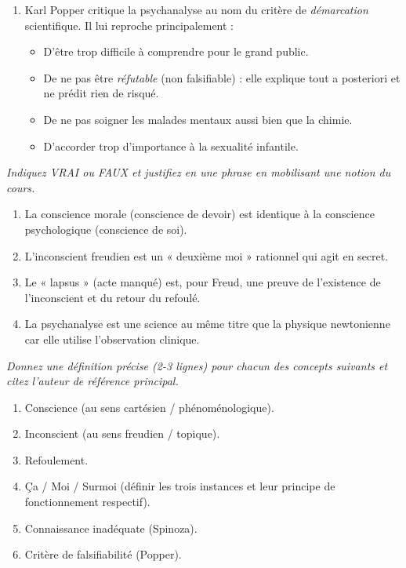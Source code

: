 \documentclass[11pt]{article}
\newcommand{\cle}[1]{{\popxbold\color{popdark}#1}}
\begin{document}
\begin{exercice}
\begin{enumerate}
\begin{itemize}
\item[A.] Le Moi (\emph{Ich}).
\item[B.] Le Surmoi (\emph{Über-Ich}).
\item[C.] Le Ça (\emph{Es}).
\item[D.] Le Préconscient.
\end{itemize}
\item Karl Popper critique la psychanalyse au nom du critère de \emph{démarcation} scientifique. Il lui reproche principalement :
\begin{itemize}
\item[A.] D'être trop difficile à comprendre pour le grand public.
\item[B.] De ne pas être \emph{réfutable} (non falsifiable) : elle explique tout a posteriori et ne prédit rien de risqué.
\item[C.] De ne pas soigner les malades mentaux aussi bien que la chimie.
\item[D.] D'accorder trop d'importance à la sexualité infantile.
\end{itemize}
\end{enumerate}
\end{exercice}

\begin{exercice}
\emph{Indiquez VRAI ou FAUX et justifiez en une phrase en mobilisant une notion du cours.}
\begin{enumerate}
\item La conscience morale (conscience de devoir) est identique à la conscience psychologique (conscience de soi).
\item L'inconscient freudien est un « deuxième moi » rationnel qui agit en secret.
\item Le « lapsus » (acte manqué) est, pour Freud, une preuve de l'existence de l'inconscient et du retour du refoulé.
\item La psychanalyse est une science au même titre que la physique newtonienne car elle utilise l'observation clinique.
\end{enumerate}
\end{exercice}

\begin{exercice}
\emph{Donnez une définition précise (2-3 lignes) pour chacun des concepts suivants et citez l'auteur de référence principal.}
\begin{enumerate}
\item \cle{Conscience} (au sens cartésien / phénoménologique).
\item \cle{Inconscient} (au sens freudien / topique).
\item \cle{Refoulement}.
\item \cle{Ça / Moi / Surmoi} (définir les trois instances et leur principe de fonctionnement respectif).
\item \cle{Connaissance inadéquate} (Spinoza).
\item \cle{Critère de falsifiabilité} (Popper).
\end{enumerate}
\end{exercice}
\end{document}
